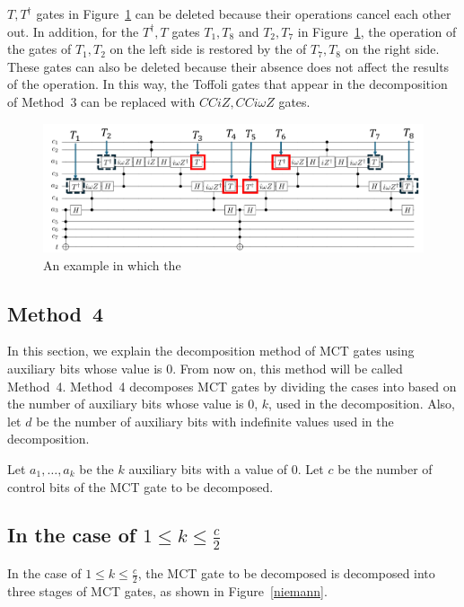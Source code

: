 $T, T^{\dag}$ gates in Figure~\ref{baker_cciomegaz} can be deleted because their operations cancel each other out.
In addition, for the $T^{\dag}, T$ gates $T_{1}, T_{8}$ and $T_{2}, T_{7}$ in Figure~\ref{baker_cciomegaz}, the operation of the  gates of $T_{1}, T_{2}$ on the left side is restored by the  of $T_{7}, T_{8}$ on the right side. 
These gates can also be deleted because their absence does not affect the results of the operation.
In this way, the Toffoli gates that appear in the decomposition of Method~3 can be replaced with $CCiZ, CCi\omega Z$ gates.
\begin{figure}[tbp]
\centering
\includegraphics[width=15cm]{img/baker_iomegaz.pdf}
\caption{An example in which the }
\label{baker_cciomegaz}
\end{figure}
\subsection{Method~4}
In this section,
we explain the decomposition method\cite{niemann2019t} of MCT gates using auxiliary bits whose value is 0.
From now on, this method will be called Method~4.
Method~4 decomposes MCT gates by dividing the cases into based on the number of auxiliary bits whose value is 0, $k$, used in the decomposition.
Also, let $d$ be the number of auxiliary bits with indefinite values used in the decomposition.

Let $a_{1},\dots, a_{k}$ be the $k$ auxiliary bits with a value of 0. Let $c$ be the number of control bits of the MCT gate to be decomposed.

\subsection*{In the case of $1\leq k \leq \frac{c}{2}$}

In the case of $1\leq k \leq \frac{c}{2}$,
the MCT gate to be decomposed is decomposed into three stages of MCT gates, as shown in Figure~\ref{niemann}.

